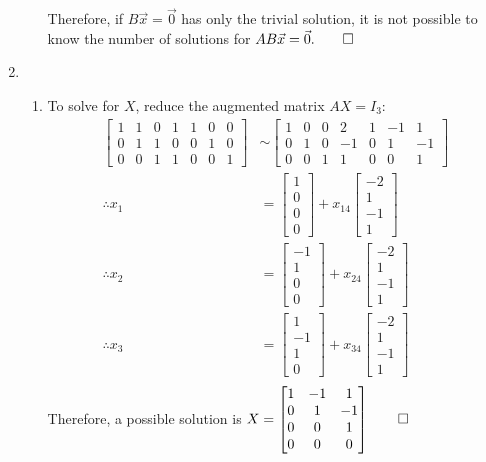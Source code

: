 \documentclass[12pt, a4paper]{article}
\begin{document}
\begin{enumerate}[Q\arabic*.]
\begin{enumerate}[(\alph*)]
        Therefore, if $B \vec{x} = \vec{0}$ has only the trivial solution, it is not possible to know the number of solutions for $AB \vec{x} = \vec{0}. \qed$
    \end{enumerate}
  \item \begin{enumerate}[(\alph*)]
      \item To solve for $X$, reduce the augmented matrix $AX = I_3$:
      \begin{align*}
        \begin{bmatrix}1&1&0&1&1&0&0\\0&1&1&0&0&1&0\\0&0&1&1&0&0&1\end{bmatrix} &\sim \begin{bmatrix}1&0&0&2&1&-1&1\\0&1&0&-1&0&1&-1\\0&0&1&1&0&0&1\end{bmatrix} \\
        \therefore x_1 &= \begin{bmatrix}1\\0\\0\\0\end{bmatrix} + x_{14}\begin{bmatrix}-2\\1\\-1\\1\end{bmatrix} \\
        \therefore x_2 &= \begin{bmatrix}-1\\1\\0\\0\end{bmatrix} + x_{24}\begin{bmatrix}-2\\1\\-1\\1\end{bmatrix} \\
        \therefore x_3 &= \begin{bmatrix}1\\-1\\1\\0\end{bmatrix} + x_{34}\begin{bmatrix}-2\\1\\-1\\1\end{bmatrix} \\
      \end{align*}
      Therefore, a possible solution is $X = \begin{bmatrix}1&-1&1\\0&1&-1\\ 0&0&1\\ 0&0&0\end{bmatrix} \qed$


\end{enumerate}
\end{enumerate}
\end{document}
